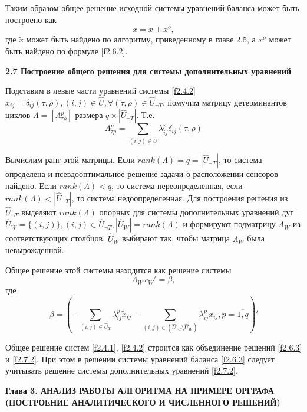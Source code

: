 \documentclass[14pt]{extarticle}%
\begin{document}
Таким образом общее решение исходной системы уравнений баланса может быть построено как 
\begin{equation}\label{f2.6.3}
x=\widetilde x+x^o,
\end{equation}
 где $\widetilde x$ может быть найдено по алгоритму, приведенному в главе 2.5, а $x^o$ может быть найдено по формуле \eqref{f2.6.2}.

\textbf{2.7 Построение общего решения для системы дополнительных уравнений}

Подставим в левые части уравнений системы \eqref{f2.4.2} $x_{ij}=\delta_{ij}(\tau,\rho), (i,j)\in \widehat{U}, \forall (\tau,\rho)\in \widehat{U}_{\neg T}$. помучим матрицу детерминантов циклов $\Lambda=[\Lambda^p_{\tau\rho}]$ размера $q\times |\widehat{U}_{\neg T}|$. Т.е.
\begin{equation}\label{f2.7.1}
	\Lambda^p_{\tau\rho}=\sum_{(i,j)\in \widehat{U}} \lambda_{ij}^p\delta_{ij}(\tau,\rho)
\end{equation}

Вычислим ранг этой матрицы. Если $rank(\Lambda)=q=|\widehat{U}_{\neg T}|$, то система определена и псевдооптимальное решение задачи о расположении сенсоров найдено. Если $rank(\Lambda)<q$, то система переопределенная, если $rank(\Lambda)<|\widehat{U}_{\neg T}|$, то система недоопределенная. Для построения решения из $\widehat{U}_{\neg T}$ выделяют $rank(\Lambda)$ опорных для системы дополнительных уравнений дуг $\widehat{U}_W=\{(i,j)\},(i,j)\in \widehat{U}_{\neg T}, |\widehat{U}_W|=rank(\Lambda)$ и формируют подматрицу $\Lambda_W$ из соответствующих столбцов. $\widehat{U}_W$ выбирают так, чтобы матрица $\Lambda_W$ была невырожденной.

Общее решение этой системы находится как решение системы 
\begin{equation}\label{f2.7.2}
	\Lambda_W x_W'=\beta,
\end{equation}
где
\begin{equation}\label{f2.7.3}
	\beta = \left(-\sum_{(i,j)\in \widehat{U}_T}\lambda^p_{ij}\widetilde{x}_{ij}-\sum_{(i,j)\in (\widehat{U}_{\neg T}\setminus\widehat{U}_W)}\lambda^p_{ij}x_{ij}, p=\overline{1,q}\right)'
\end{equation}

Общее решение систем \eqref{f2.4.1}, \eqref{f2.4.2} строится как объединение решений \eqref{f2.6.3} и \eqref{f2.7.2}. При этом в решении системы уравнений баланса \eqref{f2.6.3} следует учитывать решение системы дополнительных уравнений \eqref{f2.7.2}.
\newpage
\begin{center}
\textbf{Глава 3. АНАЛИЗ РАБОТЫ АЛГОРИТМА НА ПРИМЕРЕ ОРГРАФА (ПОСТРОЕНИЕ АНАЛИТИЧЕСКОГО И ЧИСЛЕННОГО РЕШЕНИЙ)}
\end{center}
\end{document}
